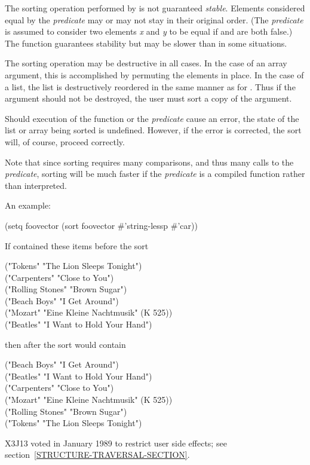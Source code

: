 \begin{defun}[Function]
The sorting operation performed by  is not guaranteed {\it stable}.
Elements considered equal by the {\it predicate} may or may not
stay in their original order.  (The {\it predicate} is assumed to
consider two elements {\it x} and {\it y} to be equal if
 and
 are both false.)
The function  guarantees
stability but may be slower than  in some situations.

The sorting operation may be destructive in all cases.  In the case of an
array argument, this is accomplished by permuting the elements in place.
In the case of a list, the list is
destructively reordered in the same manner as for
.  Thus if the argument should not be destroyed, the
user must sort a copy of the argument.

Should execution of the  function or the {\it predicate} cause an error,
the state of the list or array being sorted is
undefined.  However, if the error is corrected, the sort will, of
course, proceed correctly. 

Note that since sorting requires many comparisons, and thus
many calls to the {\it predicate}, sorting will be much faster if the
{\it predicate} is a compiled function rather than interpreted. 

An example:
\begin{lisp}
(setq foovector (sort foovector \#'string-lessp  \#'car))
\end{lisp}
If  contained these items before the sort
\begin{lisp}
("Tokens" "The Lion Sleeps Tonight") \\
("Carpenters" "Close to You") \\
("Rolling Stones" "Brown Sugar") \\
("Beach Boys" "I Get Around") \\
("Mozart" "Eine Kleine Nachtmusik" (K 525)) \\
("Beatles" "I Want to Hold Your Hand")
\end{lisp}
then after the sort  would contain
\begin{lisp}
("Beach Boys" "I Get Around") \\
("Beatles" "I Want to Hold Your Hand") \\
("Carpenters" "Close to You") \\
("Mozart" "Eine Kleine Nachtmusik" (K 525)) \\
("Rolling Stones" "Brown Sugar") \\
("Tokens" "The Lion Sleeps Tonight")
\end{lisp}

\begin{new}
X3J13 voted in January 1989
to restrict user side effects; see section~\ref{STRUCTURE-TRAVERSAL-SECTION}.
\end{new}
\end{defun}


